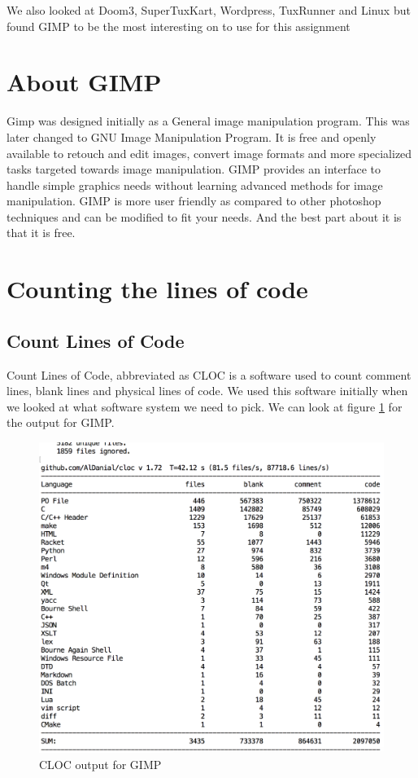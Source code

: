 We also looked at Doom3, SuperTuxKart, Wordpress, TuxRunner and Linux but found GIMP to be the most interesting on to use for this assignment
\section{About GIMP}
Gimp was designed initially as a General image manipulation program. This was later changed to GNU Image Manipulation Program. It is free and openly available to retouch and edit images, convert image formats and more specialized tasks targeted towards image manipulation. GIMP provides an interface to handle simple graphics needs without learning advanced methods for image manipulation. GIMP is more user friendly as compared to other photoshop techniques and can be modified to fit your needs. And the best part about it is that it is free.
\section{Counting the lines of code}
\subsection{Count Lines of Code}
Count Lines of Code, abbreviated as CLOC is a software used to count comment lines, blank lines and physical lines of code\cite{gitid}. We used this software initially when we looked at what software system we need to pick. We can look at figure \ref{fig:clocgimp} for the output for GIMP.
\begin{figure}
\centering
\includegraphics[width=1\textwidth]{clocgimp.png}
\caption{\label{fig:clocgimp}CLOC output for GIMP}
\end{figure}
